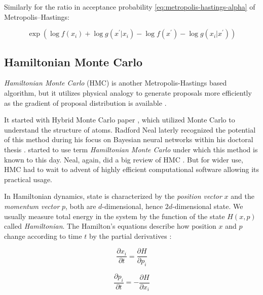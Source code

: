 \documentclass[
  digital, %
  oneside, %
  lof,     %
  lot,     %
]{fithesis4}
\begin{document}
Similarly for the ratio in acceptance probability \eqref{eq:metropolis-hastings-alpha} of Metropolis–Hastings:

\begin{equation}
  \exp \left( \log f(x_{i}) + \log g(x^{\prime} | x_{i}) - \log f(x^\prime) - \log g(x_{i} | x^{\prime}) \right)
\end{equation}


\subsection{Hamiltonian Monte Carlo}

\textit{Hamiltonian Monte Carlo} (HMC) is another Metropolis-Hastings 
based algorithm, but it utilizes physical analogy to 
generate proposals more efficiently as the gradient 
of proposal distribution is available \cite{betancourt2018}.

It started with Hybrid Monte Carlo paper \cite{duane1987}, 
which utilized Monte Carlo to understand the structure 
of atoms. 
Radford Neal laterly recognized the potential of 
this method during his focus on Bayesian neural networks 
within his doctoral thesis \cite{neal1995}. 
\cite{mackay2003} started to use 
term \textit{Hamiltonian Monte Carlo} under which this 
method is known to this day.
Neal, again, did a big review of HMC \cite{neal2011}.
But for wider use, HMC had to 
wait to advent of highly efficient 
computational software allowing its practical usage.

In Hamiltonian dynamics, state is characterized by the
\textit{position vector} $x$ and the \textit{momentum vector} $p$,
both are $d$-dimensional, hence $2d$-dimensional state.
We usually measure total energy in the system by the function of
the state $H(x, p)$ called \textit{Hamiltonian}.
The Hamilton’s equations describe how position $x$ and
$p$ change according to time $t$ by 
the partial derivatives \cite{neal2011}:

\begin{equation}
  \frac{\partial x_i}{\partial t} = \frac{\partial H}{\partial p_i}
\end{equation}

\begin{equation}
  \frac{\partial p_i}{\partial t} = - \frac{\partial H}{\partial x_i}
\end{equation}
\end{document}
